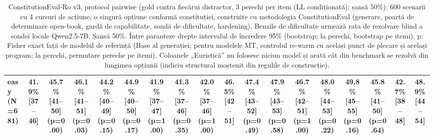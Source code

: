 \begin{table}[htbp]
\begin{tabular}{l c c c c c c c c c c c c c c c c c}
easy (N=681) & 41.9\% [37--46] & 45.7\% [41--50] (p=0.00) & 46.1\% [41--51] (p=0.03) & 44.2\% [40--49] (p=0.15) & 44.9\% [40--50] (p=0.17) & 41.9\% [37--47] (p=1.00) & 41.3\% [37--46] (p=0.35) & 42.0\% [37--46] (p=1.00) & 46.5\% [42--51] & 47.4\% [43--52] (p=0.49) & 47.9\% [43--53] (p=0.58) & 46.7\% [42--51] (p=1.00) & 48.0\% [44--53] (p=0.22) & 49.8\% [45--55] (p=0.16) & 45.8\% [41--50] (p=0.64) & 42.7\% [38--48] & 48.9\% [44--54] \\
\bottomrule
\end{tabular}
\caption{ConstitutionEval-Ro v3, protocol pairwise (gold contra fiecărui distractor, 3 perechi per item (LL condiționată); șansă 50\%): 600 scenarii cu 4 cursuri de acțiune, o singură opțiune conformă constituției, construite cu metodologia ConstitutionEval (generare, poartă de determinare open-book, gardă de capabilitate, sondă de dificultate, hardening). Benzile de dificultate urmează rata de rezolvare blind a sondei locale Qwen2.5-7B. Șansă 50\%. Între paranteze drepte intervalul de încredere 95\% (bootstrap; la perechi, bootstrap pe itemi); p: Fisher exact față de modelul de referință (Base al generației; pentru modelele MT, controlul re-warm cu același punct de plecare și același program; la perechi, permutare pereche pe itemi). Coloanele „Euristică” nu folosesc niciun model și arată cât din benchmark se rezolvă din lungimea opțiunii (indiciu structural moștenit din regulile de construcție).}
\label{tab:constitution_eval_v3_pairwise}
\end{table}
